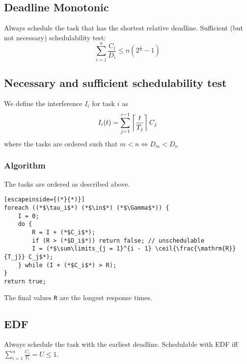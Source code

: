 \subsection{Deadline Monotonic}
Always schedule the task that has the shortest relative deadline.
Sufficient (but not necessary) schedulability test:
\begin{equation*}
	\sum_{i = 1}^n \frac{C_i}{D_i} \leq n \left( 2^{\frac{1}{n}} - 1 \right)
\end{equation*}

\subsection{Necessary and sufficient schedulability test}
We define the interference $I_i$ for task $i$ as
\begin{equation*}
	I_i(t) = \sum_{j = 1}^{i - 1} \left\lceil \frac{t}{T_j} \right\rceil C_j
\end{equation*}
where the tasks are ordered such that $m < n \iff D_m < D_n$

\subsubsection{Algorithm}
The tasks are ordered as described above.
\begin{lstlisting}[escapeinside={(*}{*)}]
foreach ((*$\tau_i$*) (*$\in$*) (*$\Gamma$*)) {
	I = 0;
	do {
		R = I + (*$C_i$*);
		if (R > (*$D_i$*)) return false; // unschedulable
		I = (*$\sum\limits_{j = 1}^{i - 1} \ceil{\frac{\mathrm{R}}{T_j}} C_j$*);
	} while (I + (*$C_i$*) > R);
}
return true;
\end{lstlisting}
The final values \texttt{R} are the longest response times.

\subsection{EDF}
Always schedule the task with the earliest deadline.
Schedulable with EDF iff $\sum\limits_{i = 1}^{n} \frac{C_i}{T_i} = U \leq 1$.
